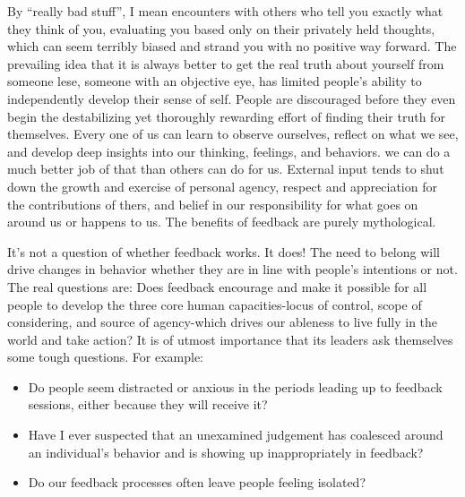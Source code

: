 \documentclass[ebook,12pt,oneside,openany]{memoir}
\begin{document}
By ``really bad stuff'', I mean encounters with others who tell you exactly what they think of you, evaluating you based only on their privately held thoughts, which can seem terribly biased and strand you with no positive way forward.
The prevailing idea that it is always better to get the real truth about yourself from someone lese, someone with an objective eye, has limited people's ability to independently develop their sense of self.
People are discouraged before they even begin the destabilizing yet thoroughly rewarding effort of finding their truth for themselves.
Every one of us can learn to observe ourselves, reflect on what we see, and develop deep insights into our thinking, feelings, and behaviors. we can do a much better job of that than others can do for us. 
External input tends to shut down the growth and exercise of personal agency, respect and appreciation for the contributions of thers, and belief in our responsibility for what goes on around us or happens to us.
The benefits of feedback are purely mythological.

It's not a question of whether feedback works. It does! The need to belong will drive changes in behavior whether they are in line with people's intentions or not. The real questions are: Does feedback encourage and make it possible for all people to develop the three core human capacities-locus of control, scope of considering, and source of agency-which drives our ableness to live fully in the world and take action?
It is of utmost importance that its leaders ask themselves some tough questions. For example:
\begin{itemize}
    \item Do people seem distracted or anxious in the periods leading up to feedback sessions, either because they will receive it? 
    \item Have I ever suspected that an unexamined judgement has coalesced around an individual's behavior and is showing up inappropriately in feedback?
    \item Do our feedback processes often leave people feeling isolated?
\end{itemize}
\end{document}
